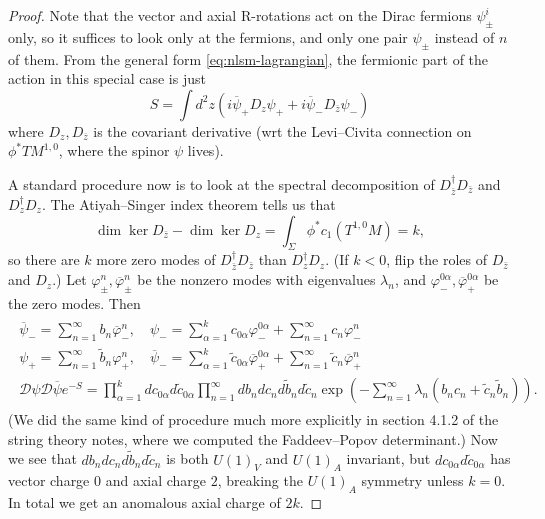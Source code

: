 \documentclass{report}
\theoremstyle{plain}
\theoremstyle{definition}
\theoremstyle{remark}
\newcommand{\cD}{\mathcal{D}}
\newcommand{\bz}{\bar{z}}
\newcommand{\cnj}{\overline}
\begin{document}
\begin{proof}
  Note that the vector and axial R-rotations act on the Dirac fermions
  $\psi_\pm^i$ only, so it suffices to look only at the fermions, and
  only one pair $\psi_\pm$ instead of $n$ of them. From the general
  form \eqref{eq:nlsm-lagrangian}, the fermionic part of the action in
  this special case is just
  \[ S = \int d^2z (i\cnj\psi_+ D_z \psi_+ + i\cnj \psi_- D_{\cnj z} \psi_-) \]
  where $D_z, D_{\cnj z}$ is the covariant derivative (wrt the
  Levi--Civita connection on $\phi^*TM^{1,0}$, where the spinor $\psi$
  lives).

  A standard procedure now is to look at the spectral decomposition of
  $D_{\bz}^\dag D_{\bz}$ and $D_z^\dag D_z$. The Atiyah--Singer index
  theorem tells us that
  \[ \dim \ker D_{\bz} - \dim \ker D_z = \int_\Sigma \phi^*c_1(T^{1,0}M) = k, \]
  so there are $k$ more zero modes of $D_{\bz}^\dag D_{\bz}$ than
  $D_z^\dag D_z$. (If $k < 0$, flip the roles of $D_{\bz}$ and $D_z$.)
  Let $\varphi_\pm^n, \cnj\varphi_\pm^n$ be the nonzero modes with
  eigenvalues $\lambda_n$, and $\varphi_-^{0\alpha},
  \cnj\varphi_+^{0\alpha}$ be the zero modes. Then
  \begin{align}
    \begin{gathered}
      \cnj\psi_- = \sum_{n=1}^\infty b_n \cnj\varphi_-^n, \quad \psi_- = \sum_{\alpha=1}^k c_{0\alpha} \varphi_-^{0\alpha} + \sum_{n=1}^\infty c_n \varphi_-^n \\
      \psi_+ = \sum_{n=1}^\infty \tilde b_n \varphi_+^n, \quad \cnj\psi_- = \sum_{\alpha=1}^k \tilde c_{0\alpha} \cnj\varphi_+^{0\alpha} + \sum_{n=1}^\infty \tilde c_n \cnj\varphi_+^n \\
      \cD \psi \cD \cnj\psi e^{-S} = \prod_{\alpha=1}^k dc_{0\alpha} d\tilde c_{0\alpha} \prod_{n=1}^\infty db_n dc_n d\tilde b_n d\tilde c_n \exp\left(-\sum_{n=1}^\infty \lambda_n (b_n c_n + \tilde c_n \tilde b_n)\right).
    \end{gathered}
  \end{align}
  (We did the same kind of procedure much more explicitly in section
  4.1.2 of the string theory notes, where we computed the
  Faddeev--Popov determinant.) Now we see that $db_n dc_n d\tilde b_n
  d\tilde c_n$ is both $U(1)_V$ and $U(1)_A$ invariant, but
  $dc_{0\alpha} d\tilde c_{0\alpha}$ has vector charge $0$ and axial
  charge $2$, breaking the $U(1)_A$ symmetry unless $k = 0$. In total
  we get an anomalous axial charge of $2k$.
\end{proof}
\end{document}
